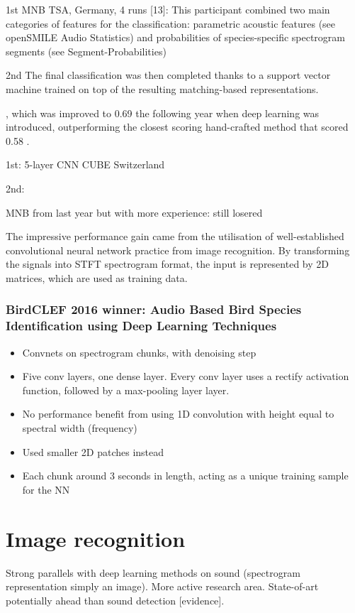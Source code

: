 \documentclass[12pt]{llncs}
\begin{document}
1st
MNB TSA, Germany, 4 runs [13]: This participant combined two main
categories of features for the classification: parametric acoustic features (see
openSMILE Audio Statistics) and probabilities of species-specific spectrogram
segments (see Segment-Probabilities)

2nd
The final
classification was then completed thanks to a support vector machine trained on
top of the resulting matching-based representations.




, which was improved to 0.69 the following year when deep learning was introduced, outperforming the closest scoring hand-crafted method that scored 0.58 \cite{joly2016lifeclef}. 


1st: 5-layer CNN CUBE Switzerland


2nd:

MNB from last year but with more experience: still losered







The impressive performance gain came from the utilisation of well-established convolutional neural network practice from image recognition. By transforming the signals into STFT spectrogram format, the input is represented by 2D matrices, which are used as training data. 



\subsubsection*{BirdCLEF 2016 winner: Audio Based Bird Species Identification using
Deep Learning Techniques \cite{sprengel2016audio}}
\begin{itemize}
	\item Convnets on spectrogram chunks, with denoising step
	\item Five conv layers, one dense layer. Every conv layer uses a rectify activation function, followed by a max-pooling layer
	layer. 
	\item No performance benefit from using 1D convolution with height equal to spectral width (frequency)
	\item Used smaller 2D patches instead
	\item Each chunk around 3 seconds in length, acting as a unique training sample for the NN
\end{itemize}

\section{Image recognition}
\label{sec:imagerecognition}
Strong parallels with deep learning methods on sound (spectrogram representation simply an image). More active research area. State-of-art potentially ahead than sound detection [evidence].
\end{document}
